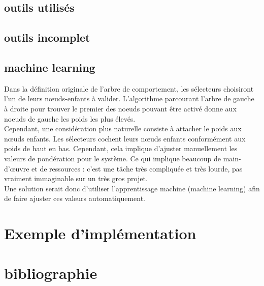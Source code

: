 \documentclass[titlepage]{article}
\begin{document}
		\subsection{outils utilisés}
		\subsection{outils incomplet}
		\subsection{machine learning}
		Dans la définition originale de l’arbre de comportement, les sélecteurs choisiront l’un de leurs nœuds-enfants à valider. L’algorithme parcourant l'arbre de gauche à droite pour trouver le premier des noeuds pouvant être activé donne aux noeuds de gauche les poids les plus élevés. \cite{Fu2016/08}
		\\
		Cependant, une considération plus naturelle consiste à attacher le poids aux nœuds enfants. Les sélecteurs cochent leurs nœuds enfants conformément aux poids de haut en bas. Cependant, cela implique d'ajuster manuellement les valeurs de pondération pour le système. Ce qui implique beaucoup de main-d'œuvre et de ressources : c'est une tâche très compliquée et très lourde, pas vraiment immaginable sur un très gros projet. \cite{Fu2016/08}
		\\
		Une solution serait donc d'utiliser l'apprentissage machine (machine learning) afin de faire ajuster ces valeurs automatiquement.
	
	\clearpage
	\section{Exemple d'implémentation}
	
	\clearpage
	\section{bibliographie}
	
	
	
\end{document}
